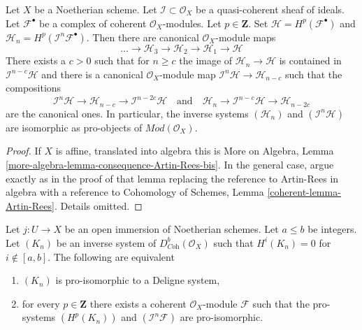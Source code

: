 \begin{lemma}
\label{lemma-consequence-Artin-Rees-bis}
Let $X$ be a Noetherian scheme. Let $\mathcal{I} \subset \mathcal{O}_X$
be a quasi-coherent sheaf of ideals. Let $\mathcal{F}^\bullet$ be a
complex of coherent $\mathcal{O}_X$-modules. Let $p \in \mathbf{Z}$.
Set $\mathcal{H} = H^p(\mathcal{F}^\bullet)$ and
$\mathcal{H}_n = H^p(\mathcal{I}^n\mathcal{F}^\bullet)$.
Then there are canonical $\mathcal{O}_X$-module maps
$$
\ldots \to \mathcal{H}_3 \to \mathcal{H}_2 \to \mathcal{H}_1 \to \mathcal{H}
$$
There exists a $c > 0$ such that for $n \geq c$ the image of
$\mathcal{H}_n \to \mathcal{H}$ is contained in
$\mathcal{I}^{n - c}\mathcal{H}$ and there is a canonical
$\mathcal{O}_X$-module map
$\mathcal{I}^n\mathcal{H} \to \mathcal{H}_{n - c}$ such that the compositions
$$
\mathcal{I}^n \mathcal{H} \to \mathcal{H}_{n - c} \to
\mathcal{I}^{n - 2c}\mathcal{H}
\quad\text{and}\quad
\mathcal{H}_n \to \mathcal{I}^{n - c}\mathcal{H} \to \mathcal{H}_{n - 2c}
$$
are the canonical ones. In particular, the inverse systems
$(\mathcal{H}_n)$ and $(\mathcal{I}^n\mathcal{H})$
are isomorphic as pro-objects of $\textit{Mod}(\mathcal{O}_X)$.
\end{lemma}

\begin{proof}
If $X$ is affine, translated into algebra this is More on Algebra, Lemma
\ref{more-algebra-lemma-consequence-Artin-Rees-bis}.
In the general case, argue exactly as in the proof of that lemma
replacing the reference to Artin-Rees in algebra with a reference to
Cohomology of Schemes, Lemma \ref{coherent-lemma-Artin-Rees}.
Details omitted.
\end{proof}

\begin{lemma}
\label{lemma-characterize-extension-by-zero-algebra}
Let $j : U \to X$ be an open immersion of Noetherian schemes.
Let $a \leq b$ be integers. Let $(K_n)$ be an inverse system of
$D^b_{\textit{Coh}}(\mathcal{O}_X)$
such that $H^i(K_n) = 0$ for $i \not \in [a, b]$.
The following are equivalent
\begin{enumerate}
\item $(K_n)$ is pro-isomorphic to a Deligne system,
\item for every $p \in \mathbf{Z}$ there exists a coherent
$\mathcal{O}_X$-module $\mathcal{F}$ such that the pro-systems
$(H^p(K_n))$ and $(\mathcal{I}^n\mathcal{F})$ are pro-isomorphic.
\end{enumerate}
\end{lemma}

